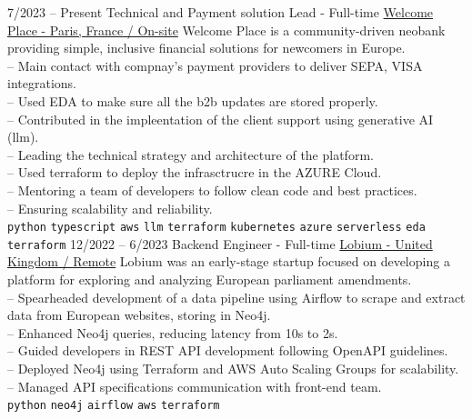 \documentclass[9pt]{developercv}
\begin{document}
\begin{entrylist}
	\entry
	{7/2023 -- Present}
	{Technical and Payment solution Lead - Full-time}
	{
		\href{https://www.linkedin.com/company/welcome-place/}{Welcome Place - Paris, France / On-site}}
	{
		Welcome Place is a community-driven neobank providing simple, inclusive financial solutions for newcomers in Europe. \\
		-- Main contact with compnay's payment providers to deliver SEPA, VISA integrations.\\
		-- Used EDA to make sure all the b2b updates are stored properly.\\
		-- Contributed in the impleentation of the client support using generative AI (llm).\\
		-- Leading the technical strategy and architecture of the platform. \\
		-- Used terraform to deploy the infrasctrucre in the AZURE Cloud. \\
		-- Mentoring a team of developers to follow clean code and best practices. \\
		-- Ensuring scalability and reliability. \\
		\texttt{python}\slashsep
		\texttt{typescript}\slashsep
		\texttt{aws}\slashsep
		\texttt{llm}\slashsep
		\texttt{terraform}\slashsep
		\texttt{kubernetes}\slashsep
		\texttt{azure}\slashsep
		\texttt{serverless}\slashsep
		\texttt{eda}\slashsep
		\texttt{terraform}\slashsep
	}
		\entry
	{12/2022 -- 6/2023}
	{Backend Engineer - Full-time}
	{
		\href{https://www.linkedin.com/company/lobium/}{Lobium - United Kingdom / Remote}}
	{
		Lobium was an early-stage startup focused on developing a platform for exploring and analyzing European parliament amendments. \\
		-- Spearheaded development of a data pipeline using Airflow to scrape and extract data from European websites, storing in Neo4j. \\
		-- Enhanced Neo4j queries, reducing latency from 10s to 2s. \\
		-- Guided developers in REST API development following OpenAPI guidelines. \\
		-- Deployed Neo4j using Terraform and AWS Auto Scaling Groups for scalability. \\
		-- Managed API specifications communication with front-end team. \\
		\texttt{python}\slashsep
		\texttt{neo4j}\slashsep
		\texttt{airflow}\slashsep
		\texttt{aws}\slashsep
		\texttt{terraform}
}
\end{entrylist}
\end{document}

